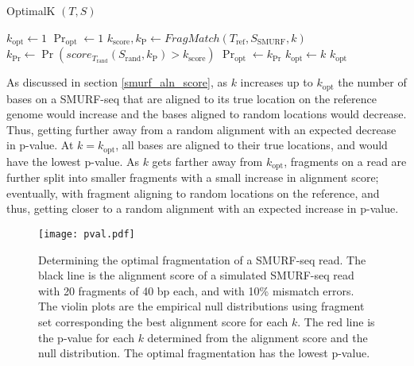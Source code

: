 \begin{algorithm}[H]
\caption{OptimalK $(T,S)$}
\begin{algorithmic}[1]
  \STATE $k_\mathrm{opt} \leftarrow 1$
  \STATE $\Pr_\mathrm{opt} \leftarrow 1$
    \STATE $k_\mathrm{score}, k_\mathrm{P} \leftarrow
              FragMatch(T_\mathrm{ref},S_\mathrm{SMURF},k)$
    \STATE $k_{\Pr} \leftarrow \Pr(score_{T_\mathrm{rand}}
              (S_\mathrm{rand},k_\mathrm{P}) > k_\mathrm{score})$
      \STATE $\Pr_\mathrm{opt} \leftarrow k_{\Pr}$
      \STATE $k_\mathrm{opt} \leftarrow k$
    \ENDIF
  \ENDFOR
  \RETURN $k_\mathrm{opt}$
\end{algorithmic}
\label{p_val_alg}
\end{algorithm}

As discussed in section \ref{smurf_aln_score}, as $k$ increases up to
$k_\mathrm{opt}$ the number of bases on a SMURF-seq that are aligned to
its true location on the reference genome would increase and the bases
aligned to random locations would decrease. Thus, getting further away
from a random alignment with an expected decrease in p-value. At $k =
k_\mathrm{opt}$, all bases are aligned to their true locations, and
would have the lowest p-value. As $k$ gets farther away from
$k_\mathrm{opt}$, fragments on a read are further split into smaller
fragments with a small increase in alignment score; eventually, with
fragment aligning to random locations on the reference, and thus,
getting closer to a random alignment with an expected increase in
p-value.

\begin{figure}[t!]
\centering
\texttt{[image: pval.pdf]}
\caption[Determining the optimal fragmentation of a SMURF-seq read]{
  Determining the optimal fragmentation of a SMURF-seq read. The black
  line is the alignment score of a simulated SMURF-seq read with 20
  fragments of 40 bp each, and with 10\% mismatch errors. The violin plots
  are the empirical null distributions using fragment set corresponding
  the best alignment score for each $k$. The red line is the p-value for
  each $k$ determined from the alignment score and the null distribution.
  The optimal fragmentation has the lowest p-value.}
\label{pval_calc}
\end{figure}


